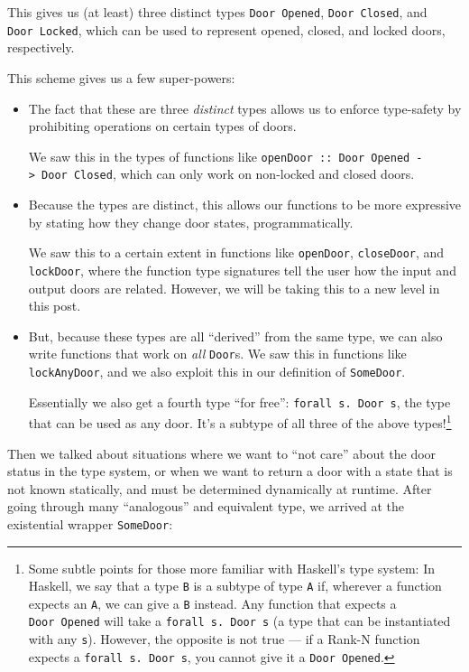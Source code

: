 \documentclass[]{article}
\begin{document}
This gives us (at least) three distinct types
\texttt{Door\ \textquotesingle{}Opened},
\texttt{Door\ \textquotesingle{}Closed}, and
\texttt{Door\ \textquotesingle{}Locked}, which can be used to represent opened,
closed, and locked doors, respectively.

This scheme gives us a few super-powers:

\begin{itemize}
\item
  The fact that these are three \emph{distinct} types allows us to enforce
  type-safety by prohibiting operations on certain types of doors.

  We saw this in the types of functions like
  \texttt{openDoor\ ::\ Door\ \textquotesingle{}Opened\ -\textgreater{}\ Door\ \textquotesingle{}Closed},
  which can only work on non-locked and closed doors.
\item
  Because the types are distinct, this allows our functions to be more
  expressive by stating how they change door states, programmatically.

  We saw this to a certain extent in functions like \texttt{openDoor},
  \texttt{closeDoor}, and \texttt{lockDoor}, where the function type signatures
  tell the user how the input and output doors are related. However, we will be
  taking this to a new level in this post.
\item
  But, because these types are all ``derived'' from the same type, we can also
  write functions that work on \emph{all} \texttt{Door}s. We saw this in
  functions like \texttt{lockAnyDoor}, and we also exploit this in our
  definition of \texttt{SomeDoor}.

  Essentially we also get a fourth type ``for free'':
  \texttt{forall\ s.\ Door\ s}, the type that can be used as any door. It's a
  subtype of all three of the above types!\footnote{Some subtle points for those
    more familiar with Haskell's type system: In Haskell, we say that a type
    \texttt{B} is a subtype of type \texttt{A} if, wherever a function expects
    an \texttt{A}, we can give a \texttt{B} instead. Any function that expects a
    \texttt{Door\ \textquotesingle{}Opened} will take a
    \texttt{forall\ s.\ Door\ s} (a type that can be instantiated with any
    \texttt{s}). However, the opposite is not true --- if a Rank-N function
    expects a \texttt{forall\ s.\ Door\ s}, you cannot give it a
    \texttt{Door\ \textquotesingle{}Opened}.}
\end{itemize}

Then we talked about situations where we want to ``not care'' about the door
status in the type system, or when we want to return a door with a state that is
not known statically, and must be determined dynamically at runtime. After going
through many ``analogous'' and equivalent type, we arrived at the existential
wrapper \texttt{SomeDoor}:
\end{document}
